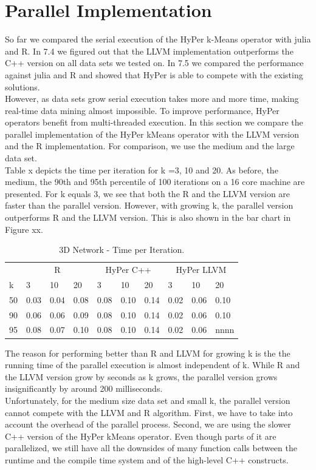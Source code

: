 \section{Parallel Implementation}


So far we compared the serial execution of the HyPer k-Means operator with julia and R. In 7.4 we figured out that the LLVM implementation outperforms the C++ version on all data sets we tested on. In 7.5 we compared the performance against julia and R and showed that HyPer is able to compete with the existing solutions.
\\
However, as data sets grow serial execution takes more and more time, making real-time data mining almost impossible. To improve performance, HyPer operators benefit from multi-threaded execution. In this section we compare the parallel implementation of the HyPer kMeans operator with the LLVM version and the R implementation. For comparison, we use the medium and the large data set.
\\
Table x depicts the time per iteration for k =3, 10 and 20. As before, the medium, the 90th and 95th percentile of 100 iterations on a 16 core machine are presented. For k equals 3, we see that both the R and the LLVM version are faster than the parallel version. However, with growing k, the parallel version outperforms R and the LLVM version. This is also shown in the bar chart in Figure xx.

\begin{table}[htsb]
  \caption[3D Network - Time per Iteration]{3D Network - Time per Iteration.}
  \label{tab:network_all}
  \centering
  \begin{tabular}{l l l l l l l l l l }
    \toprule
      & \multicolumn{3}{c}{R} & \multicolumn{3}{c}{HyPer C++} & \multicolumn{3}{c}{HyPer LLVM}  \\
      k & 3 & 10 & 20 & 3 & 10 & 20 & 3 & 10 & 20 \\
    \midrule
      50  & 0.03 & 0.04 & 0.08 & 0.08 & 0.10 & 0.14 & 0.02 & 0.06 & 0.10 \\
      90  & 0.06 & 0.06 & 0.09 & 0.08 & 0.10 & 0.14 & 0.02 & 0.06 & 0.10 \\
      95  & 0.08 & 0.07 & 0.10 & 0.08 & 0.10 & 0.14 & 0.02 & 0.06 & nnnn \\
    \bottomrule
  \end{tabular}
\end{table}


The reason for performing better than R and LLVM for growing k is the the running time of the parallel execution is almost independent of k. While R and the LLVM version grow by seconds as k grows, the parallel version grows insignificantly by around 200 milliseconds. 
\\
Unfortunately, for the medium size data set and small k, the parallel version cannot compete with the LLVM and R algorithm.  First, we have to take into account the overhead of the parallel process. Second, we are using the slower C++ version of the HyPer kMeans operator. Even though parts of it are parallelized, we still have all the downsides of many function calls between the runtime and the compile time system and of the high-level C++ constructs.

